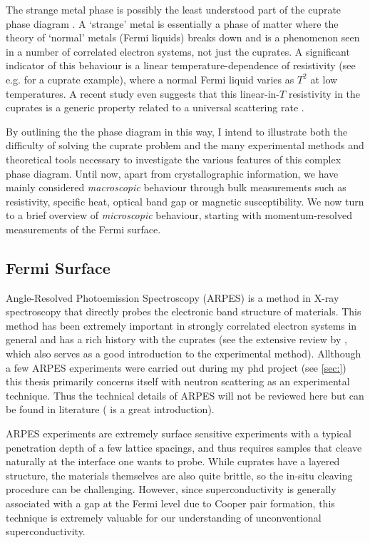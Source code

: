 The strange metal phase is possibly the least understood part of the cuprate phase diagram \cite{Keimer2015}. A `strange' metal is essentially a phase of matter where the theory of `normal' metals (Fermi liquids) breaks down and is a phenomenon seen in a number of correlated electron systems, not just the cuprates. A significant indicator of this behaviour is a linear temperature-dependence of resistivity (see e.g. \cite{Martin1990} for a cuprate example), where a normal Fermi liquid varies as $T^2$ at low temperatures. A recent study even suggests that this linear-in-$T$ resistivity in the cuprates is a generic property related to a universal scattering rate \cite{Legros2018}.

By outlining the the phase diagram in this way, I intend to illustrate both the difficulty of solving the cuprate problem and the many experimental methods and theoretical tools necessary to investigate the various features of this complex phase diagram. Until now, apart from crystallographic information, we have mainly considered \emph{macroscopic} behaviour through bulk measurements such as resistivity, specific heat, optical band gap or magnetic susceptibility. We now turn to a brief overview of \emph{microscopic} behaviour, starting with momentum-resolved measurements of the Fermi surface.

\subsection{Fermi Surface}
Angle-Resolved Photoemission Spectroscopy (ARPES) is a method in X-ray spectroscopy that directly probes the electronic band structure of materials. This method has been extremely important in strongly correlated electron systems in general and has a rich history with the cuprates (see the extensive review by \citeauthor{Damascelli2003} \cite{Damascelli2003}, which also serves as a good introduction to the experimental method). Allthough a few ARPES experiments were carried out during my phd project (see \ref{sec:}) this thesis primarily concerns itself with neutron scattering as an experimental technique. Thus the technical details of ARPES will not be reviewed here but can be found in literature (\cite{Osterwalder2014} is a great introduction).

ARPES experiments are extremely surface sensitive experiments with a typical penetration depth of a few lattice spacings, and thus requires samples that cleave naturally at the interface one wants to probe. While cuprates have a layered structure, the materials themselves are also quite brittle, so the in-situ cleaving procedure can be challenging. However, since superconductivity is generally associated with a gap at the Fermi level due to Cooper pair formation, this technique is extremely valuable for our understanding of unconventional superconductivity.

